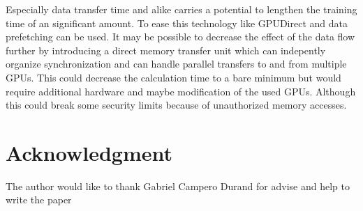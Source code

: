 \documentclass[conference]{IEEEtran}
\begin{document}
Especially data transfer time and alike carries a potential to lengthen the training time of an significant amount. To ease this technology like GPUDirect\cite{nvidiagpudirect2017} and data prefetching\cite{yang2010gpgpu} can be used. It may be possible to decrease the effect of the data flow further by introducing a direct memory transfer unit which can indepently organize synchronization and can handle parallel transfers to and from multiple GPUs. This could decrease the calculation time to a bare minimum but would require additional hardware and maybe modification of the used GPUs. Although this could break some security limits because of unauthorized memory accesses. 

\section*{Acknowledgment}
The author would like to thank Gabriel Campero Durand for advise and help to write the paper







\end{document}
